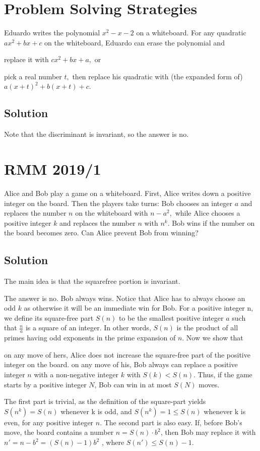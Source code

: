 \documentclass[blue,onecol]{shooting}
\begin{document}
\section{Problem Solving Strategies}

Eduardo writes the polynomial $x^2-x-2$ on a whiteboard. For any quadratic $ax^2+bx+c$ on the whiteboard, Eduardo can erase the polynomial and
\begin{itemize}
        \Item replace it with $cx^2 + bx + a,$ or
        
        \Item pick a real number $t,$ then replace his quadratic with (the expanded form of)
$a(x + t)^2 + b(x + t) + c.$
\end{itemize}

\subsection{Solution}

Note that the discriminant is invariant, so the answer is no.

\section{RMM 2019/1}

Alice and Bob play a game on a whiteboard. First, Alice writes down a positive integer on the board. Then the players take turns: Bob chooses an integer $a$ and replaces the number $n$ on the whiteboard with $n-a^2,$ while Alice chooses a positive integer $k$ and replaces the number $n$ with $n^k.$ Bob wins if the number on the board becomes zero. Can Alice prevent Bob from winning?

\subsection{Solution}
 
The main idea is that the squarefree portion is invariant.

The answer is no. Bob always wins. Notice that Alice has to always choose an odd $k$ as otherwise it will be an immediate win for Bob. For a positive integer n, we define its square-free part
$S(n)$ to be the smallest positive integer $a$ such that $\frac{n}{a}$ is a square of an integer. In other words,
$S(n)$ is the product of all primes having odd exponents in the prime expansion of $n$.
Now we show that \begin{itemize}
    \Item on any move of hers, Alice does not increase the square-free part of the positive integer on the board.
    \Item on any move of his, Bob always can replace a positive integer $n$ with a non-negative integer $k$ with $S(k) < S(n)$. Thus, if the game starts by a positive integer $N$, Bob can win in at most $S(N)$ moves.
\end{itemize}  
The first part is trivial, as the definition of the square-part yields $S(n^k) = S(n)$ whenever k is odd, and $S(n^k) = 1 \leq S(n)$ whenever k is even, for any positive integer $n$.
The second part is also easy. If, before Bob’s move, the board contains a number $n = S(n)\cdot b^2$, then Bob may replace it with $n' = n - b^2 = (S(n) - 1)b^2$ , where $S(n') \leq S(n) - 1.$ 
 
\end{document}
